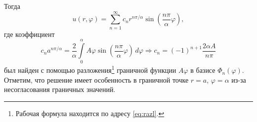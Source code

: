 Тогда  
\[
  u(r, \varphi) = \sum_{n=1}^\infty c_n r^{n\pi/\alpha}\sin \left(
  \frac{n\pi}{\alpha}\varphi \right),
\]
где коэффициент
\[
  c_na^{n\pi/\alpha} = \frac{2}{\alpha} \int\limits_{0}^{\alpha}A\varphi \sin
  \left( \frac{n\pi}{\alpha}\varphi \right) \,d\varphi \Rightarrow
  c_n = (-1)^{n+1} \frac{2\alpha A}{n\pi}
\]
был найден с помощью разложения\footnote{Рабочая формула находится по адресу
\eqref{eq:razl}.} граничной функции $ A\varphi $ в базисе $
\Phi_n(\varphi) $. Отметим, что решение имеет особенность в граничной точке $r =
a$, $\varphi = \alpha$
из-за несогласования граничных значений.
